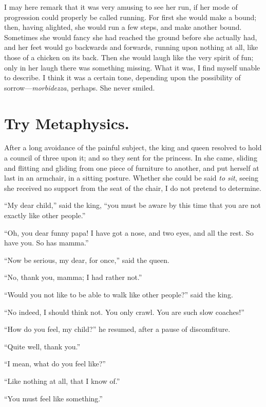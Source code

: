 \documentclass[12pt]{memoir}
\begin{document}
I may here remark that it was very amusing to see her run, if her mode
of progression could properly be called running.  For first she would
make a bound; then, having alighted, she would run a few steps, and
make another bound.  Sometimes she would fancy she had reached the
ground before she actually had, and her feet would go backwards and
forwards, running upon nothing at all, like those of a chicken on its
back.  Then she would laugh like the very spirit of fun; only in her
laugh there was something missing.  What it was, I find myself unable
to describe.  I think it was a certain tone, depending upon the
possibility of sorrow---\emph{morbidezza}, perhaps.  She never smiled.



\chapter{Try Metaphysics.}


After a long avoidance of the painful subject, the king and queen
resolved to hold a council of three upon it; and so they sent for the
princess.  In she came, sliding and flitting and gliding from one
piece of furniture to another, and put herself at last in an armchair,
in a sitting posture.  Whether she could be said \emph{to sit}, seeing
she received no support from the seat of the chair, I do not pretend
to determine.

``My dear child,'' said the king, ``you must be aware by this time
that you are not exactly like other people.''

``Oh, you dear funny papa!  I have got a nose, and two eyes, and all
the rest.  So have you.  So has mamma.''

``Now be serious, my dear, for once,'' said the queen.

``No, thank you, mamma; I had rather not.''

``Would you not like to be able to walk like other people?'' said the
king.

``No indeed, I should think not.  You only crawl.  You are such slow
coaches!''

``How do you feel, my child?'' he resumed, after a pause of
discomfiture.

``Quite well, thank you.''

``I mean, what do you feel like?''

``Like nothing at all, that I know of.''

``You must feel like something.''
\end{document}
